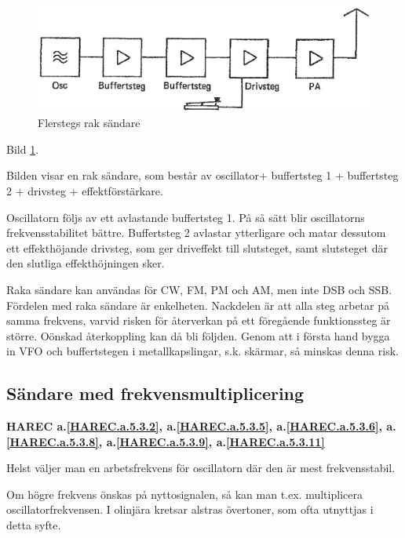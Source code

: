 \begin{figure}
  \includegraphics[width=\textwidth]{images/cropped_pdfs/bild_2_5-02.pdf}
  \caption{Flerstegs rak sändare}
  \label{fig:bildII5-2}
\end{figure}

Bild \ref{fig:bildII5-2}.

Bilden visar en rak sändare, som består av oscillator+ buffertsteg 1 +
buffertsteg 2 + drivsteg + effektförstärkare.

Oscillatorn följs av ett avlastande buffertsteg 1. På så sätt blir
oscillatorns frekvensstabilitet bättre. Buffertsteg 2 avlastar
ytterligare och matar dessutom ett effekthöjande drivsteg, som ger
driveffekt till slutsteget, samt slutsteget där den slutliga
effekthöjningen sker.

Raka sändare kan användas för CW, FM, PM och AM, men inte DSB och SSB.
Fördelen med raka sändare är enkelheten.  Nackdelen är att alla steg
arbetar på samma frekvens, varvid risken för återverkan på ett
föregående funktionssteg är större. Oönskad återkoppling kan då bli
följden. Genom att i första hand bygga in VFO och buffertstegen i
metallkapslingar, s.k. skärmar, så minskas denna risk.

\subsection{Sändare med frekvensmultiplicering}
\textbf{
HAREC a.\ref{HAREC.a.5.3.2}\label{myHAREC.a.5.3.2},
 a.\ref{HAREC.a.5.3.5}\label{myHAREC.a.5.3.5},
 a.\ref{HAREC.a.5.3.6}\label{myHAREC.a.5.3.6},
 a.\ref{HAREC.a.5.3.8}\label{myHAREC.a.5.3.8},
 a.\ref{HAREC.a.5.3.9}\label{myHAREC.a.5.3.9},
 a.\ref{HAREC.a.5.3.11}\label{myHAREC.a.5.3.11}
}

Helst väljer man en arbetsfrekvens för oscillatorn där den är mest
frekvensstabil.

Om högre frekvens önskas på nyttosignalen, så kan man
t.ex. multiplicera oscillatorfrekvensen. I olinjära kretsar alstras
övertoner, som ofta utnyttjas i detta syfte.

